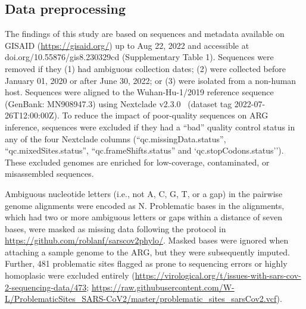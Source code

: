 \documentclass{article}
\begin{document}


\subsection{Data preprocessing}

The findings of this study are
based on sequences and metadata available on GISAID (\url{https://gisaid.org/})
up to Aug 22, 2022 and accessible at
doi.org/10.55876/gis8.230329cd (Supplementary Table 1). Sequences were removed
if they (1) had ambiguous collection dates; (2) were collected before January
01, 2020 or after June 30, 2022; or (3) were isolated from a non-human host.
Sequences were aligned to the Wuhan-Hu-1/2019 reference sequence (GenBank:
MN908947.3) using Nextclade v2.3.0~\citep{Aksamentov2021-hj} (dataset tag
2022-07-26T12:00:00Z). To reduce the impact of poor-quality sequences on ARG
inference, sequences were excluded if they had a ``bad'' quality control status
in any of the four Nextclade columns (``qc.missingData.status'',
``qc.mixedSites.status'', ``qc.frameShifts.status'' and
`qc.stopCodons.status''). These excluded genomes are enriched for low-coverage,
contaminated, or misassembled sequences.

Ambiguous nucleotide letters (i.e.,
not A, C, G, T, or a gap) in the pairwise genome alignments were encoded as N.
Problematic bases in the alignments, which had two or more ambiguous letters or
gaps within a distance of seven bases, were masked as missing data following
the protocol in \url{https://github.com/roblanf/sarscov2phylo/}. Masked bases
were ignored when attaching a sample genome to the ARG, but they were
subsequently imputed. Further, 481 problematic sites flagged as prone to
sequencing errors or highly homoplasic were excluded entirely
(\url{https://virological.org/t/issues-with-sars-cov-2-sequencing-data/473};
\url{https://raw.githubusercontent.com/W-L/ProblematicSites_SARS-CoV2/master/problematic_sites_sarsCov2.vcf}).
\end{document}
